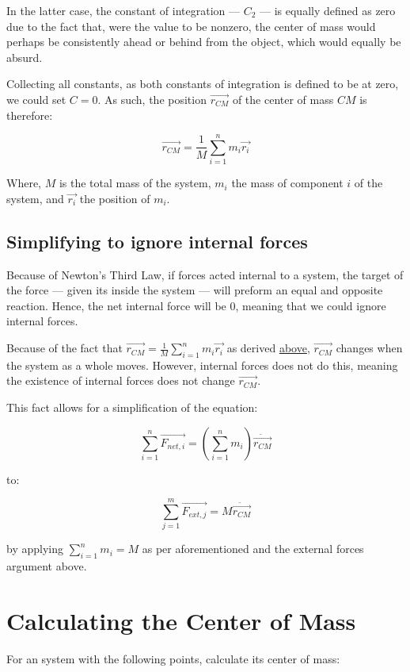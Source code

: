 \documentclass[letterpaper]{article}
\begin{document}
In the latter case, the constant of integration --- \(C_2\) --- is equally defined as zero due to the fact that, were the value to be nonzero, the center of mass would perhaps be consistently ahead or behind from the object, which would equally be absurd.

Collecting all constants, as both constants of integration is defined to be at zero, we could set \(C=0\). As such, the position \(\vec{r_{CM}}\) of the center of mass \(CM\) is therefore:

\begin{equation}
\vec{r_{CM}} = \frac{1}{M} \sum^n_{i=1} m_i \vec{r_i}
\end{equation}

Where, \(M\) is the total mass of the system, \(m_i\) the mass of component \(i\) of the system, and \(\vec{r_i}\) the position of \(m_i\).

\subsection{Simplifying to ignore internal forces}
\label{sec:orgdcbf45c}
Because of Newton's Third Law, if forces acted internal to a system, the target of the force --- given its inside the system --- will preform an equal and opposite reaction. Hence, the net internal force will be \(0\), meaning that we could ignore internal forces.

Because of the fact that \(\vec{r_{CM}} = \frac{1}{M} \sum^n_{i=1} m_i \vec{r_i}\) as derived \hyperref[sec:org86d6aec]{above}, \(\vec{r_{CM}}\) changes when the system as a whole moves. However, internal forces does not do this, meaning the existence of internal forces does not change \(\vec{r_{CM}}\).

This fact allows for a simplification of the equation:

\begin{equation}
\sum^n_{i=1} \vec{F_{net,i}} = (\sum^n_{i=1} m_i) \ddot{\vec{r_{CM}}}
\end{equation}

to:

\begin{equation}
\sum^m_{j=1} \vec{F_{ext,j}} = M \ddot{\vec{r_{CM}}}
\end{equation}

by applying  \(\sum^n_{i=1} m_i = M\) as per aforementioned and the external forces argument above.

\section{Calculating the Center of Mass}
\label{sec:orgc601986}
For an system with the following points, calculate its center of mass:
\end{document}
